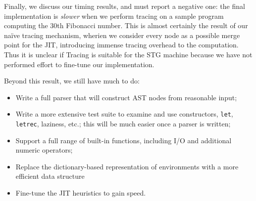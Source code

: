 \documentclass[preprint]{sigplanconf}
\begin{document}
Finally, we discuss our timing results, and must report a negative one:
the final implementation is \emph{slower} when we perform tracing on
a sample program computing the 30th Fibonacci number. This is almost certainly
the result of our na\"{i}ve tracing mechanism, wherien we consider every node as
a possible merge point for the JIT, introducing immense tracing overhead to the
computation. Thus it is unclear if Tracing is suitable for the STG machine
because we have not performed effort to fine-tune our implementation.

Beyond this result, we still have much to do:
\begin{itemize}
\item Write a full parser that will construct AST nodes from reasonable input;
\item Write a more extensive test suite to examine and use constructors,
      \lstinline{let}, \lstinline{letrec}, laziness, etc.; this will be much
      easier once a parser is written;
\item Support a full range of built-in functions, including I/O and additional
      numeric operators;
\item Replace the dictionary-based representation of environments with a
      more efficient data structure
\item Fine-tune the JIT heuristics to gain speed.
\end{itemize}







\softraggedright


\end{document}

